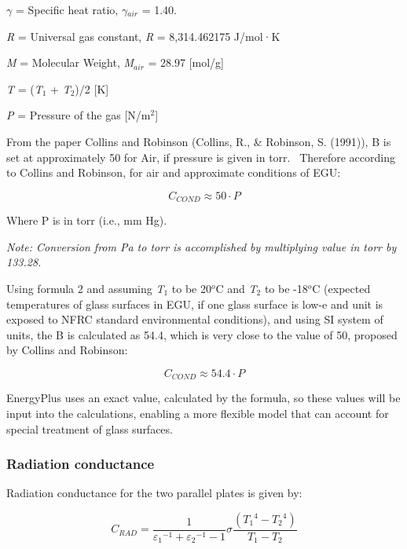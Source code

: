 $\gamma$ = Specific heat ratio, $\gamma$\(_{air}\) = 1.40.

\emph{R} = Universal gas constant, \emph{R} = 8,314.462175 J/mol·K

\emph{M} = Molecular Weight, \emph{M}\(_{air}\) = 28.97 {[}mol/g{]}

\emph{T} = (\emph{T}\(_{1}\) + \emph{T}\(_{2}\))/2 {[}K{]}

\emph{P} = Pressure of the gas {[}N/m\(^{2}\){]}

From the paper Collins and Robinson (Collins, R., \& Robinson, S. (1991)), B is set at approximately 50 for Air, if pressure is given in torr.~ Therefore according to Collins and Robinson, for air and approximate conditions of EGU:

\begin{equation}
  C_{COND} \approx 50 \cdot P
\end{equation}

Where P is in torr (i.e., mm Hg).

\emph{Note: Conversion from Pa to torr is accomplished by multiplying value in torr by 133.28.}

Using formula 2 and assuming \emph{T}\(_{1}\) to be 20\(^{o}\)C and \emph{T}\(_{2}\) to be -18\(^{o}\)C (expected temperatures of glass surfaces in EGU, if one glass surface is low-e and unit is exposed to NFRC standard environmental conditions), and using SI system of units, the B is calculated as 54.4, which is very close to the value of 50, proposed by Collins and Robinson:

\begin{equation}
  C_{COND} \approx 54.4 \cdot P
\end{equation}

EnergyPlus uses an exact value, calculated by the formula, so these values will be input into the calculations, enabling a more flexible model that can account for special treatment of glass surfaces.

\subsubsection{Radiation conductance}\label{radiation-conductance}

Radiation conductance for the two parallel plates is given by:

\begin{equation}
{C_{RAD}} = \frac{1}{{{\varepsilon_1}^{ - 1} + {\varepsilon_2}^{ - 1} - 1}}\sigma \frac{{\left( {{T_1}^4 - {T_2}^4} \right)}}{{{T_1} - {T_2}}}
\label{eq:RadiationConductanceEquation}
\end{equation}

